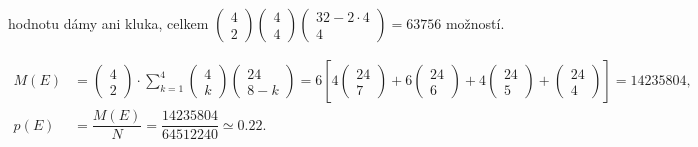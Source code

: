 \begin{example}
\begin{enumerate}
          hodnotu dámy ani kluka, celkem 
          \(\begin{pmatrix} 4 \\ 2 \end{pmatrix}
            \begin{pmatrix} 4 \\ 4\end{pmatrix}
            \begin{pmatrix} 32-2\cdot4 \\ 4 \end{pmatrix} = \num{63756}\) možností.
    \end{enumerate}
    \begin{align*}
      M(E) &= \begin{pmatrix} 4 \\ 2 \end{pmatrix}\cdot\sum^{4}_{k=1}
              \begin{pmatrix} 4 \\ k \end{pmatrix}\begin{pmatrix} 24 \\ 8 - k \end{pmatrix}
            = 6\left[ 
                  4\begin{pmatrix} 24 \\ 7 \end{pmatrix} +
                  6\begin{pmatrix} 24 \\ 6 \end{pmatrix} +
                  4\begin{pmatrix} 24 \\ 5 \end{pmatrix} +
                   \begin{pmatrix} 24 \\ 4 \end{pmatrix}
                \right] = \num{14235804},                                                \\
      p(E) &= \dfrac{M(E)}{N} = \dfrac{\num{14235804}}{\num{64512240}} \simeq \num{0.22}.
    \end{align*}
    

\end{example}
